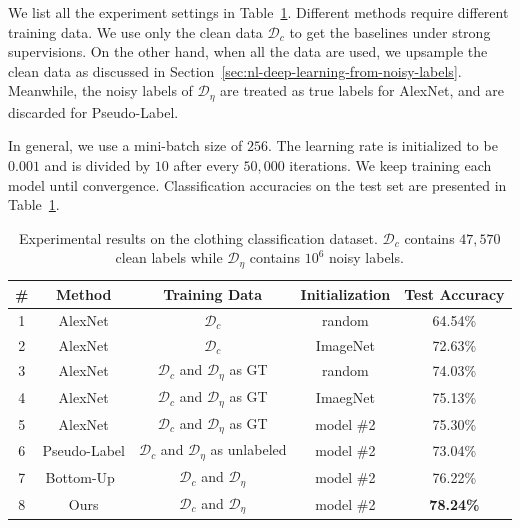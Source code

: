 We list all the experiment settings in Table~\ref{tab:nl-exp}. Different methods require different training data. We use only the clean data $\mathcal{D}_c$ to get the baselines under strong supervisions. On the other hand, when all the data are used, we upsample the clean data as discussed in Section~\ref{sec:nl-deep-learning-from-noisy-labels}. Meanwhile, the noisy labels of $\mathcal{D}_{\eta}$ are treated as true labels for AlexNet, and are discarded for Pseudo-Label.

In general, we use a mini-batch size of $256$. The learning rate is initialized to be $0.001$ and is divided by $10$ after every $50,000$ iterations. We keep training each model until convergence. Classification accuracies on the test set are presented in Table~\ref{tab:nl-exp}.

\begin{table}[t]
\begin{center}
\begin{tabular}{c|c|c|c|c}
\hline
\# & Method & Training Data & Initialization & Test Accuracy\\
\hline\hline
1 & AlexNet & $\mathcal{D}_c$ & random & 64.54\% \\
2 & AlexNet & $\mathcal{D}_c$ & ImageNet & 72.63\% \\
3 & AlexNet & $\mathcal{D}_c$ and $\mathcal{D}_{\eta}$ as GT & random & 74.03\% \\
4 & AlexNet & $\mathcal{D}_c$ and $\mathcal{D}_{\eta}$ as GT & ImaegNet & 75.13\% \\
5 & AlexNet & $\mathcal{D}_c$ and $\mathcal{D}_{\eta}$ as GT & model \#2 & 75.30\% \\
6 & Pseudo-Label\cite{lee2013pseudo} & $\mathcal{D}_c$ and $\mathcal{D}_{\eta}$ as unlabeled & model \#2 & 73.04\% \\
7 & Bottom-Up~\cite{sukhbaatar2014learning} & $\mathcal{D}_c$ and $\mathcal{D}_{\eta}$ & model \#2 & 76.22\% \\
8 & Ours & $\mathcal{D}_c$ and $\mathcal{D}_{\eta}$ & model \#2 & \textbf{78.24\%} \\
\hline
\end{tabular}
\end{center}
\caption{Experimental results on the clothing classification dataset. $\mathcal{D}_c$ contains $47,570$ clean labels while $\mathcal{D}_{\eta}$ contains $10^6$ noisy labels.}
\label{tab:nl-exp}
\end{table}

